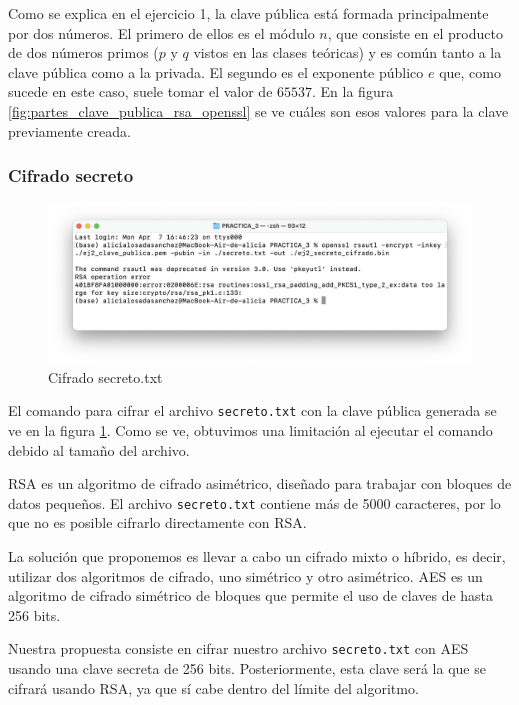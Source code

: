 Como se explica en el ejercicio 1, la clave pública está formada principalmente por dos números. El primero de ellos es el módulo $n$, que consiste en el producto de dos números primos ($p$ y $q$ vistos en las clases teóricas) y es común tanto a la clave pública como a la privada. El segundo es el exponente público $e$ que, como sucede en este caso, suele tomar el valor de $65537$. En la figura \ref{fig:partes_clave_publica_rsa_openssl} se ve cuáles son esos valores para la clave previamente creada. 

\subsubsection{Cifrado secreto}

\begin{figure}[H]   
    \centering
    \includegraphics[width=\textwidth]{ej2_c.png}
    \caption{Cifrado secreto.txt}
    \label{fig:cifrado_secreto_openssl}
\end{figure}

El comando para cifrar el archivo \texttt{secreto.txt} con la clave pública generada se ve en la figura \ref{fig:cifrado_secreto_openssl}. Como se ve, obtuvimos una limitación al ejecutar el comando debido al tamaño del archivo.  

RSA es un algoritmo de cifrado asimétrico, diseñado para trabajar con bloques de datos pequeños. El archivo \texttt{secreto.txt} contiene más de 5000 caracteres, por lo que no es posible cifrarlo directamente con RSA. 

La solución que proponemos es llevar a cabo un cifrado mixto o híbrido, es decir, utilizar dos algoritmos de cifrado, uno simétrico y otro asimétrico. AES es un algoritmo de cifrado simétrico de bloques que permite el uso de claves de hasta 256 bits. 

Nuestra propuesta consiste en cifrar nuestro archivo \texttt{secreto.txt} con AES usando una clave secreta de 256 bits. Posteriormente, esta clave será la que se cifrará usando RSA, ya que sí cabe dentro del límite del algoritmo. 
